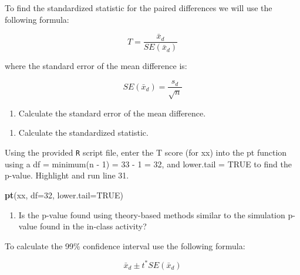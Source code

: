\documentclass[
]{report}
\newenvironment{Shaded}{\begin{snugshade}}{\end{snugshade}}
\newcommand{\DataTypeTok}[1]{\textcolor[rgb]{0.13,0.29,0.53}{#1}}
\newcommand{\DecValTok}[1]{\textcolor[rgb]{0.00,0.00,0.81}{#1}}
\newcommand{\KeywordTok}[1]{\textcolor[rgb]{0.13,0.29,0.53}{\textbf{#1}}}
\newcommand{\NormalTok}[1]{#1}
\newcommand{\OtherTok}[1]{\textcolor[rgb]{0.56,0.35,0.01}{#1}}
\providecommand{\tightlist}{%
  \setlength{\itemsep}{0pt}\setlength{\parskip}{0pt}}
\begin{document}
\vspace{1in}

To find the standardized statistic for the paired differences we will use the following formula:

\[T = \frac{\bar{x}_d}{SE(\bar{x}_d)}\]

where the standard error of the mean difference is:

\[SE(\bar{x}_d)=\frac{s_d}{\sqrt{n}}\]

\begin{enumerate}
\def\labelenumi{\arabic{enumi}.}
\setcounter{enumi}{1}
\tightlist
\item
  Calculate the standard error of the mean difference.
\end{enumerate}

\vspace{0.5in}

\begin{enumerate}
\def\labelenumi{\arabic{enumi}.}
\setcounter{enumi}{2}
\tightlist
\item
  Calculate the standardized statistic.
\end{enumerate}

\vspace{0.5in}

Using the provided \texttt{R} script file, enter the T score (for xx) into the pt function using a df = minimum(n - 1) = 33 - 1 = 32, and lower.tail = TRUE to find the p-value. Highlight and run line 31.

\begin{Shaded}
\begin{Highlighting}[]
\KeywordTok{pt}\NormalTok{(xx, }\DataTypeTok{df=}\DecValTok{32}\NormalTok{, }\DataTypeTok{lower.tail=}\OtherTok{TRUE}\NormalTok{)}
\end{Highlighting}
\end{Shaded}

\begin{enumerate}
\def\labelenumi{\arabic{enumi}.}
\setcounter{enumi}{3}
\tightlist
\item
  Is the p-value found using theory-based methods similar to the simulation p-value found in the in-class activity?
\end{enumerate}

\vspace{0.5in}

To calculate the 99\% confidence interval use the following formula:

\[\bar{x}_d\pm t^* SE(\bar{x}_d)\]
\end{document}
